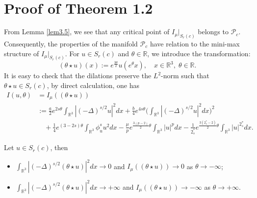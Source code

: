 \section{Proof of Theorem 1.2}

From Lemma \ref{lem3.5}, we see that any critical point of $I_\mu|_{S_r(c)}$ belongs 
to $\mathcal{P}_c$. Consequently, the properties of the manifold $\mathcal{P}_c$ have  
relation to the mini-max structure of $I_\mu|_{ S_{r}(c)}$. For $u\in  S_{r}(c)$ and 
$\theta\in \mathbb{R}$, we introduce the transformation:
\[ %
(\theta \star u)(x):=e^{\frac{3\theta}{2}}u(e^\theta x), \quad
x\in \mathbb{R}^3,\;\theta \in \mathbb{R}.
\]
It is easy to check that the dilations preserve the $L^2$-norm such that
$\theta \star u\in  S_{r}(c)$, by direct calculation, one has
\begin{align*}%
I(u,\theta)
&= I_\mu((\theta \star u))\\
&:= \frac{a}{2}e^{2s\theta}\int_{\mathbb{R}^3}|(-\Delta)^{s/2}u|^2dx
+\frac{b}{4}e^{4s\theta}\Big(\int_{\mathbb{R}^3}|(-\Delta)^{s/2}u|^2dx\Big)^2\\
&\quad +\frac{1}{4}e^{(3-2s)\theta}\int_{\mathbb{R}^3}\phi^s_u u^2dx-\frac{\mu}{p}e^{\frac{3(p-2)}{2}\theta}\int_{\mathbb{R}^3}|u|^pdx-
\frac{1}{2^*_s}e^{\frac{3(2^*_s-2)}{2}\theta}\int_{\mathbb{R}^3}|u|^{2^*_s}dx.
\end{align*}

\begin{lemma}\label{lem5.1}
Let $u\in  S_{r}(c)$, then
\begin{itemize}
\item[(i)] $\int_{\mathbb{R}^3}|(-\Delta)^{s/2}(\theta \star u)|^2dx\to 0$ and 
$I_\mu((\theta \star u))\to 0$ as $\theta \to -\infty$;

\item[(ii)] $\int_{\mathbb{R}^3}|(-\Delta)^{s/2}(\theta \star u)|^2dx\to +\infty$ and 
$I_\mu((\theta \star u))\to -\infty$ as $\theta \to +\infty$.
\end{itemize}
\end{lemma}

